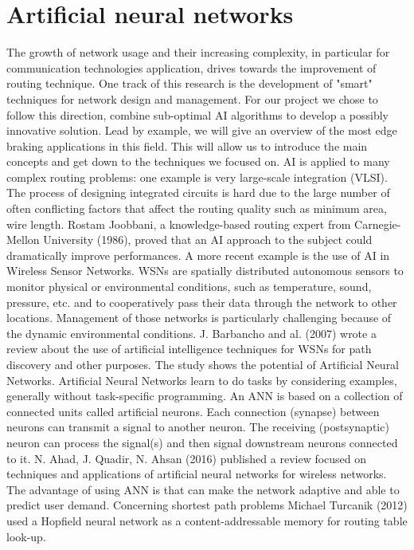 \section{Artificial neural networks}
\bigbreak
The growth of network usage and their increasing complexity, in particular for communication technologies application, drives towards the improvement of routing technique. One track of this research is the development of "smart" techniques for network design and management.
\bigbreak
For our project we chose to follow this direction, combine sub-optimal AI algorithms to develop a possibly innovative solution. Lead by example, we will give an overview of the most edge braking applications in this field. This will allow us to introduce the main concepts and get down to the techniques we focused on.
\bigbreak
AI is applied to many complex routing problems: one example is very large-scale integration (VLSI).  The process of designing integrated circuits is hard due to the large number of often conflicting factors that affect the routing quality such as minimum area, wire length. Rostam Joobbani, a knowledge-based routing expert from Carnegie-Mellon University (1986), proved that an AI approach to the subject could dramatically improve performances. 
\bigbreak
A more recent example is the use of AI in Wireless Sensor Networks. WSNs are spatially distributed autonomous sensors to monitor physical or environmental conditions, such as temperature, sound, pressure, etc. and to cooperatively pass their data through the network to other locations. Management of those networks is particularly challenging because of the dynamic environmental conditions. 
J. Barbancho and al. (2007) wrote a review about the use of artificial intelligence techniques for WSNs for path discovery and other purposes. The study shows the potential of Artificial Neural Networks. 
\bigbreak
Artificial Neural Networks learn to do tasks by considering examples, generally without task-specific programming. An ANN is based on a collection of connected units called artificial neurons. Each connection (synapse) between neurons can transmit a signal to another neuron. The receiving (postsynaptic) neuron can process the signal(s) and then signal downstream neurons connected to it.
\bigbreak
N. Ahad, J.  Quadir, N. Ahsan (2016) published a review focused on techniques and applications of artificial neural networks for wireless networks. The advantage of using ANN is that can make the network adaptive and able to predict user demand.
\bigbreak
Concerning shortest path problems Michael Turcanik (2012) used a Hopfield neural network as a content-addressable memory for routing table look-up.
